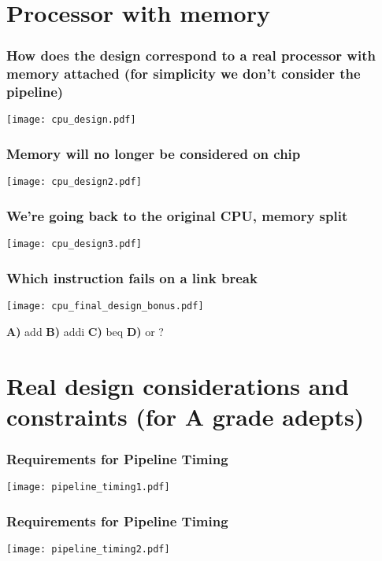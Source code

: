 \documentclass{beamer}
\begin{document}
\section{Processor with memory}

\begin{frame}
\frametitle{How does the design correspond to a real processor with memory attached (for simplicity we don't consider the pipeline)}
\texttt{[image: cpu\_design.pdf]}
\end{frame}

\begin{frame}
\frametitle{Memory will no longer be considered on chip}
\texttt{[image: cpu\_design2.pdf]}
\end{frame}

\begin{frame}
\frametitle{We're going back to the original CPU, memory split}
\texttt{[image: cpu\_design3.pdf]}
\end{frame}

\begin{frame}
\frametitle{Which instruction fails on a link break}
\texttt{[image: cpu\_final\_design\_bonus.pdf]}

\textbf{A)} add \hfill \textbf{B)} addi \hfill \textbf{C)} beq \hfill \textbf{D)} or \hfill ?
\end{frame}

\section{Real design considerations and constraints (for A grade adepts)}

\begin{frame}
\frametitle{Requirements for Pipeline Timing}
\texttt{[image: pipeline\_timing1.pdf]}
\end{frame}

\begin{frame}
\frametitle{Requirements for Pipeline Timing}
\texttt{[image: pipeline\_timing2.pdf]}
\end{frame}
\end{document}
